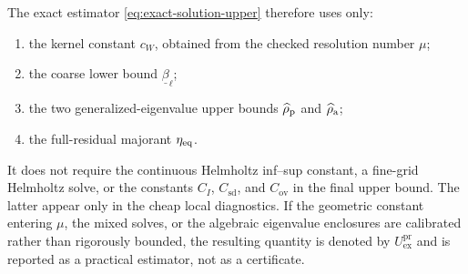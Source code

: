 The exact estimator \eqref{eq:exact-solution-upper} therefore uses only:
\begin{enumerate}
\item the kernel constant $c_W$, obtained from the checked resolution
      number $\mu$;
\item the coarse lower bound $\underline\beta_\ell$;
\item the two generalized-eigenvalue upper bounds $\widehat\rho_{\mathrm p}$ and $\widehat\rho_{\mathrm a}$;
\item the full-residual majorant $\eta_{\mathrm{eq}}$.
\end{enumerate}
It does not require the continuous Helmholtz inf--sup constant, a fine-grid
Helmholtz solve, or the constants $C_I$, $C_{\mathrm{sd}}$, and
$C_{\mathrm{ov}}$ in the final upper bound.  The latter appear only in the
cheap local diagnostics.  If the geometric constant entering $\mu$, the
mixed solves, or the algebraic eigenvalue enclosures are calibrated rather
than rigorously bounded, the resulting quantity is denoted by
$U_{\mathrm{ex}}^{\mathrm{pr}}$ and is reported as a practical estimator,
not as a certificate.


